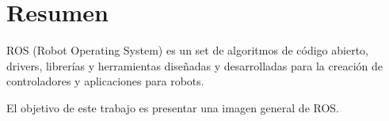 

\chapter*{Resumen}



\todo[inline]{}
	
ROS (Robot Operating System) es un set de algoritmos de código abierto, drivers, librerías y herramientas diseñadas y desarrolladas para la creación de controladores y aplicaciones para robots.

El objetivo de este trabajo es presentar una imagen general de ROS.


  




